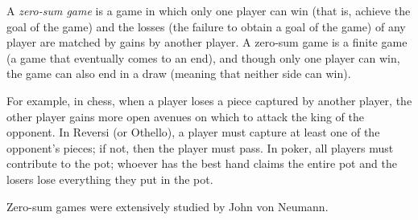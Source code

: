 \documentclass[12pt]{article}
\begin{document}
A \emph{zero-sum game} is a game in which only one player can win (that is, achieve the goal of the game) and the losses (the failure to obtain a goal of the game) of any player are matched by gains by another player. A zero-sum game is a finite game (a game that eventually comes to an end), and though only one player can win, the game can also end in a draw (meaning that neither side can win).

For example, in chess, when a player loses a piece captured by another player, the other player gains more open avenues on which to attack the king of the opponent. In Reversi (or Othello), a player must capture at least one of the opponent's pieces; if not, then the player must pass. In poker, all players must contribute to the pot; whoever has the best hand claims the entire pot and the losers lose everything they put in the pot.

Zero-sum games were extensively studied by John von Neumann.
\end{document}
